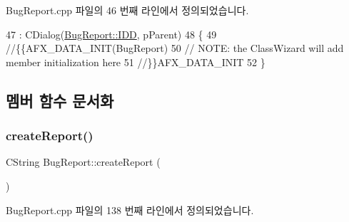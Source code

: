 Bug\+Report.\+cpp 파일의 46 번째 라인에서 정의되었습니다.


\begin{DoxyCode}
47   : CDialog(\mbox{\hyperlink{class_bug_report_ac5c6f1960b86db3b70eab6b21625913eaf9e146b90ba979e2a6a8b7a3ad251d1b}{BugReport::IDD}}, pParent)
48 \{
49   \textcolor{comment}{//\{\{AFX\_DATA\_INIT(BugReport)}
50   \textcolor{comment}{// NOTE: the ClassWizard will add member initialization here}
51   \textcolor{comment}{//\}\}AFX\_DATA\_INIT}
52 \}
\end{DoxyCode}


\subsection{멤버 함수 문서화}
\mbox{\label{class_bug_report_afe00e8dd3efa190199d8d645cb702e07}} 
\subsubsection{\texorpdfstring{create\+Report()}{createReport()}}
{\footnotesize\ttfamily C\+String Bug\+Report\+::create\+Report (\begin{DoxyParamCaption}{ }\end{DoxyParamCaption})\hspace{0.3cm}{\ttfamily [protected]}}



Bug\+Report.\+cpp 파일의 138 번째 라인에서 정의되었습니다.


